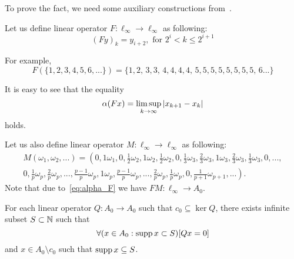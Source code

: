 To prove the fact, we need some auxiliary constructions from~\cite{our-vzms-2018}.


Let us define linear operator $F:\ell_\infty \to \ell_\infty$ as following:
\begin{equation}
	\label{operator_F}
	(Fy)_k = y_{i+2}, \mbox{ for } 2^i < k \leq 2^{i+1}
\end{equation}

For example,
$$
	F(\{1,2,3,4,5,6, ...\}) = \{1,2,\,3,3,\,4,4,4,4,\,5,5,5,5,5,5,5,5,\,6...\}
$$


It is easy to see that the equality
\begin{equation}
	\label{eq:alpha_F}
	\alpha(Fx) = \varlimsup_{k\to\infty} |x_{k+1} - x_{k}|
\end{equation}
holds.

Let us also define linear operator $M:\ell_\infty \to \ell_\infty$ as following:
\begin{multline*}
	M(\omega_1,\omega_2,...)=\left(
		0, 1\omega_1,
		0, \frac{1}{2}\omega_2, 1\omega_2, \frac{1}{2}\omega_2,
		0, \frac{1}{3}\omega_3, \frac{2}{3}\omega_3, 1\omega_3, \frac{2}{3}\omega_3, \frac{1}{3}\omega_3,
		0, ...,
	\right. \\ \left.
		0, \frac{1}{p}\omega_p, \frac{2}{p}\omega_p, ..., \frac{p-1}{p}\omega_p, 1\omega_p,
			\frac{p-1}{p}\omega_p, ..., \frac{2}{p}\omega_p, \frac{1}{p}\omega_p,
		0, \frac{1}{p+1}\omega_{p+1}, ...
	\right)
	.
\end{multline*}
Note that due to~\eqref{eq:alpha_F} we have $FM: \ell_\infty \to A_0$.


\begin{lemma}
	\label{lem:c_0_not_complemented_in_A_0}
	For each linear operator $Q: A_0 \to A_0$ such that $c_0\subseteq \ker Q$,
	there exists infinite subset $S \subset \mathbb{N}$ such that
	\begin{equation}
		\forall(x \in A_0 : \operatorname{supp} x \subset S)[Qx = 0]
	\end{equation}
	and $x\in A_0\setminus c_0$ such that $\operatorname{supp} x \subseteq S$.
\end{lemma}

